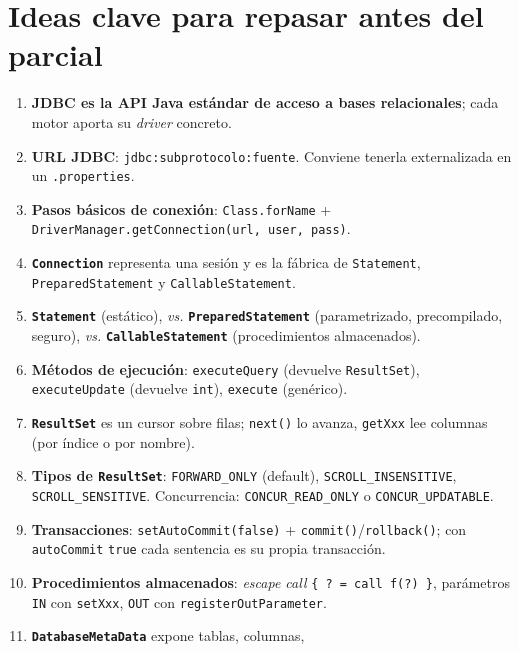 \documentclass[11pt,a4paper]{article}
\begin{document}
\section{Ideas clave para repasar antes del parcial}

\begin{enumerate}
    \item \textbf{JDBC es la API Java estándar de acceso a bases
    relacionales}; cada motor aporta su \emph{driver} concreto.
    \item \textbf{URL JDBC}: \texttt{jdbc:subprotocolo:fuente}.
    Conviene tenerla externalizada en un \texttt{.properties}.
    \item \textbf{Pasos básicos de conexión}: \texttt{Class.forName}
    + \texttt{DriverManager.getConnection(url, user, pass)}.
    \item \textbf{\texttt{Connection}} representa una sesión y es la
    fábrica de \texttt{Statement}, \texttt{PreparedStatement} y
    \texttt{CallableStatement}.
    \item \textbf{\texttt{Statement}} (estático), \emph{vs.}
    \textbf{\texttt{PreparedStatement}} (parametrizado, precompilado,
    seguro), \emph{vs.} \textbf{\texttt{CallableStatement}}
    (procedimientos almacenados).
    \item \textbf{Métodos de ejecución}: \texttt{executeQuery} (devuelve
    \texttt{ResultSet}), \texttt{executeUpdate} (devuelve
    \texttt{int}), \texttt{execute} (genérico).
    \item \textbf{\texttt{ResultSet}} es un cursor sobre filas;
    \texttt{next()} lo avanza, \texttt{getXxx} lee columnas (por
    índice o por nombre).
    \item \textbf{Tipos de \texttt{ResultSet}}: \texttt{FORWARD\_ONLY}
    (default), \texttt{SCROLL\_INSENSITIVE}, \texttt{SCROLL\_SENSITIVE}.
    Concurrencia: \texttt{CONCUR\_READ\_ONLY} o
    \texttt{CONCUR\_UPDATABLE}.
    \item \textbf{Transacciones}: \texttt{setAutoCommit(false)} +
    \texttt{commit()}/\texttt{rollback()}; con \texttt{autoCommit}
    \texttt{true} cada sentencia es su propia transacción.
    \item \textbf{Procedimientos almacenados}: \emph{escape call}
    \texttt{\{ ? = call f(?) \}}, parámetros \texttt{IN} con
    \texttt{setXxx}, \texttt{OUT} con \texttt{registerOutParameter}.
    \item \textbf{\texttt{DatabaseMetaData}} expone tablas, columnas,

\end{enumerate}
\end{document}
